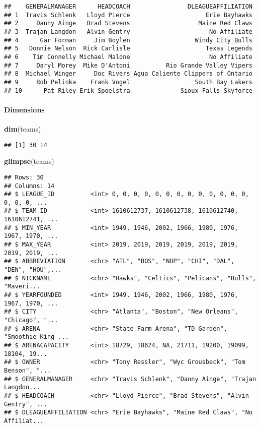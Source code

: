 \documentclass[
]{article}
\newenvironment{Shaded}{\begin{snugshade}}{\end{snugshade}}
\newcommand{\KeywordTok}[1]{\textcolor[rgb]{0.13,0.29,0.53}{\textbf{#1}}}
\newcommand{\NormalTok}[1]{#1}
\begin{document}
\begin{verbatim}
##    GENERALMANAGER      HEADCOACH                DLEAGUEAFFILIATION
## 1  Travis Schlenk   Lloyd Pierce                     Erie Bayhawks
## 2     Danny Ainge   Brad Stevens                   Maine Red Claws
## 3  Trajan Langdon   Alvin Gentry                      No Affiliate
## 4      Gar Forman     Jim Boylen                  Windy City Bulls
## 5   Donnie Nelson  Rick Carlisle                     Texas Legends
## 6    Tim Connelly Michael Malone                      No Affiliate
## 7     Daryl Morey  Mike D'Antoni          Rio Grande Valley Vipers
## 8  Michael Winger     Doc Rivers Agua Caliente Clippers of Ontario
## 9     Rob Pelinka    Frank Vogel                  South Bay Lakers
## 10      Pat Riley Erik Spoelstra              Sioux Falls Skyforce
\end{verbatim}

\hypertarget{dimensions-1}{%
\paragraph{Dimensions}\label{dimensions-1}}

\begin{Shaded}
\begin{Highlighting}[]
\KeywordTok{dim}\NormalTok{(teams)}
\end{Highlighting}
\end{Shaded}

\begin{verbatim}
## [1] 30 14
\end{verbatim}

\begin{Shaded}
\begin{Highlighting}[]
\KeywordTok{glimpse}\NormalTok{(teams)}
\end{Highlighting}
\end{Shaded}

\begin{verbatim}
## Rows: 30
## Columns: 14
## $ LEAGUE_ID          <int> 0, 0, 0, 0, 0, 0, 0, 0, 0, 0, 0, 0, 0, 0, 0, 0, ...
## $ TEAM_ID            <int> 1610612737, 1610612738, 1610612740, 1610612741, ...
## $ MIN_YEAR           <int> 1949, 1946, 2002, 1966, 1980, 1976, 1967, 1970, ...
## $ MAX_YEAR           <int> 2019, 2019, 2019, 2019, 2019, 2019, 2019, 2019, ...
## $ ABBREVIATION       <chr> "ATL", "BOS", "NOP", "CHI", "DAL", "DEN", "HOU",...
## $ NICKNAME           <chr> "Hawks", "Celtics", "Pelicans", "Bulls", "Maveri...
## $ YEARFOUNDED        <int> 1949, 1946, 2002, 1966, 1980, 1976, 1967, 1970, ...
## $ CITY               <chr> "Atlanta", "Boston", "New Orleans", "Chicago", "...
## $ ARENA              <chr> "State Farm Arena", "TD Garden", "Smoothie King ...
## $ ARENACAPACITY      <int> 18729, 18624, NA, 21711, 19200, 19099, 18104, 19...
## $ OWNER              <chr> "Tony Ressler", "Wyc Grousbeck", "Tom Benson", "...
## $ GENERALMANAGER     <chr> "Travis Schlenk", "Danny Ainge", "Trajan Langdon...
## $ HEADCOACH          <chr> "Lloyd Pierce", "Brad Stevens", "Alvin Gentry", ...
## $ DLEAGUEAFFILIATION <chr> "Erie Bayhawks", "Maine Red Claws", "No Affiliat...
\end{verbatim}
\end{document}
